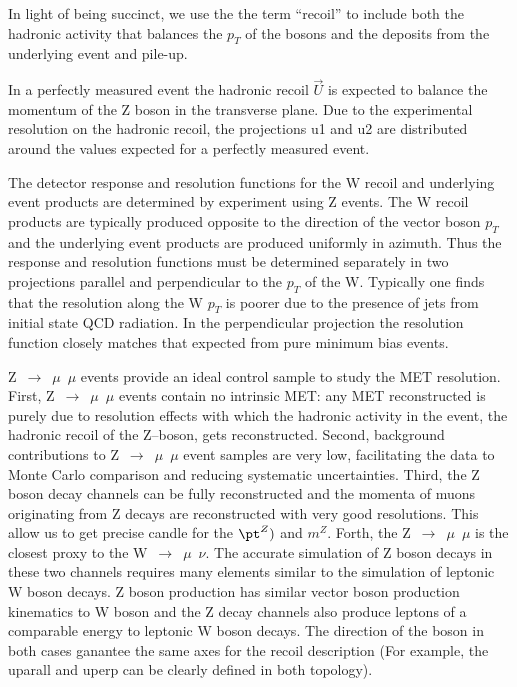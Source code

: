 In light of being succinct, we use the the term “recoil” to include both the hadronic activity that balances the $p_{T}$ of the bosons and the deposits from the underlying event and pile-up.

In a perfectly measured event the hadronic recoil $\vec{U}$  is expected to balance the momentum of the Z boson in the transverse plane.
Due to the experimental resolution on the hadronic recoil, the projections u1 and u2 are distributed around the values expected
for a perfectly measured event.

The detector response and resolution functions for the W recoil and underlying event products are determined by experiment using Z events.
The W recoil products are typically produced opposite to the direction of the vector boson $p_{T}$ and the underlying event products are produced uniformly in azimuth. Thus the response and resolution functions must be determined separately in two projections parallel and perpendicular to the $p_{T}$ of the W. Typically one finds that the resolution along the W $p_{T}$ is poorer due to the presence of jets from initial state QCD radiation. In the perpendicular projection the resolution function closely matches that expected from pure minimum bias events.

Z~$\rightarrow$~$\mu$~$\mu$ events provide an ideal control sample to study the MET resolution. 
First, Z~$\rightarrow$~$\mu$~$\mu$ events contain no intrinsic MET: any MET reconstructed is purely due to resolution effects with which the hadronic activity in the event, the hadronic recoil of the Z–boson, gets reconstructed.
Second, background contributions to Z~$\rightarrow$~$\mu$~$\mu$ event samples are very low, facilitating the data to Monte Carlo comparison and reducing systematic uncertainties.
Third, the Z boson decay channels can be fully reconstructed and the momenta of muons originating from Z decays are reconstructed with very good resolutions. This allow us to get precise candle for the $\pt^{Z})$ and $m^{Z}$.
Forth, the Z~$\rightarrow$~$\mu$~$\mu$ is the closest proxy to the W~$\rightarrow$~$\mu$~$\nu$.
The accurate simulation of Z boson decays in these two channels requires many elements similar to the simulation of leptonic W boson decays.
Z boson production has similar vector boson production kinematics to W boson and the Z decay channels also produce leptons of a comparable energy to leptonic W boson decays.
{\color{magenta}{HERE SAY ON THE MASS The boson are also comparable and make the energy of the recoil similar with similar scale (For example, with massless photon is more of a mess).}}
The direction of the boson in both cases ganantee the same axes for the recoil description (For example, the uparall and uperp can be clearly defined in both topology).

